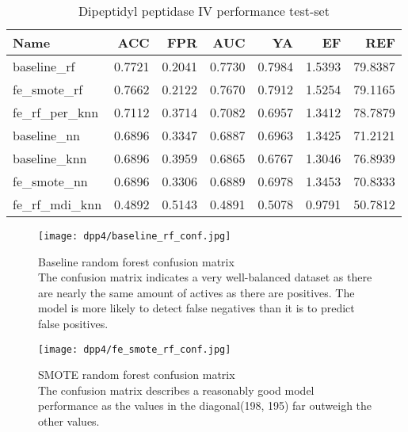 \begin{table}[H]
    \begin{center}
        \caption{Dipeptidyl peptidase IV performance test-set}
        \begin{tabular}{lrrrrrr}
            \toprule
            Name             & ACC    & FPR    & AUC    & YA     & EF     & REF     \\
            \midrule
            baseline\_rf     & 0.7721 & 0.2041 & 0.7730 & 0.7984 & 1.5393 & 79.8387 \\
            fe\_smote\_rf    & 0.7662 & 0.2122 & 0.7670 & 0.7912 & 1.5254 & 79.1165 \\
            fe\_rf\_per\_knn & 0.7112 & 0.3714 & 0.7082 & 0.6957 & 1.3412 & 78.7879 \\
            baseline\_nn     & 0.6896 & 0.3347 & 0.6887 & 0.6963 & 1.3425 & 71.2121 \\
            baseline\_knn    & 0.6896 & 0.3959 & 0.6865 & 0.6767 & 1.3046 & 76.8939 \\
            fe\_smote\_nn    & 0.6896 & 0.3306 & 0.6889 & 0.6978 & 1.3453 & 70.8333 \\
            fe\_rf\_mdi\_knn & 0.4892 & 0.5143 & 0.4891 & 0.5078 & 0.9791 & 50.7812 \\
            \bottomrule
        \end{tabular}
    \end{center}
\end{table}

\begin{figure}[H]
    \begin{center}
        \captionsetup{justification=centering}
        \texttt{[image: dpp4/baseline\_rf\_conf.jpg]}
        \caption[]{Baseline random forest confusion matrix\\
            The confusion matrix indicates a very well-balanced dataset as there are nearly the same amount of actives as there are positives. The model is more likely to detect false negatives than it is to predict false positives.
        }
        \label{fig:dpp4_baseline_rf_conf}
    \end{center}
\end{figure}
\begin{figure}[H]
    \begin{center}
        \captionsetup{justification=centering}
        \texttt{[image: dpp4/fe\_smote\_rf\_conf.jpg]}
        \caption[]{SMOTE random forest confusion matrix\\
            The confusion matrix describes a reasonably good model performance as the values in the diagonal(198, 195) far outweigh the other values.
        }
        \label{fig:dpp4_smote_rf_conf}
    \end{center}

\end{figure}

